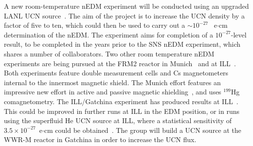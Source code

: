 A new room-temperature nEDM experiment will be conducted using an
upgraded LANL UCN source~\cite{Steven_talk}. The aim of the project is
to increase the UCN density by a factor of five to ten, which could
then be used to carry out a $\sim 10^{-27}$~ e$\cdot$cm determination
of the nEDM.  The experiment aims for completion of a $10^{-27}$-level
result, to be completed in the years prior to the SNS nEDM experiment,
which shares a number of collaborators.  Two other room temperature
nEDM experiments are being pursued at the FRM2 reactor in
Munich~\cite{altarev2012} and at ILL~\cite{Serebrov2015}. Both
experiments feature double measurement cells and Cs magnetometers
internal to the innermost magnetic shield. The Munich effort features
an impressive new effort in active and passive magnetic
shielding~\cite{altarev2014magnetically,
  altarev2015large,altarev2015minimizing,altarev2012next}, and uses
$^{199}$Hg comagnetometry. The ILL/Gatchina experiment has produced
results at ILL~\cite{Serebrov2015}. This could be improved in further
runs at ILL in the EDM position, or in runs using the superfluid He
UCN source at ILL, where a statistical sensitivity of
$3.5 \times 10^{-27}$~e$\cdot$cm could be
obtained~\cite{Serebrov_talk}. The group will build a UCN source at
the WWR-M reactor in Gatchina in order to increase the UCN flux.




















 

